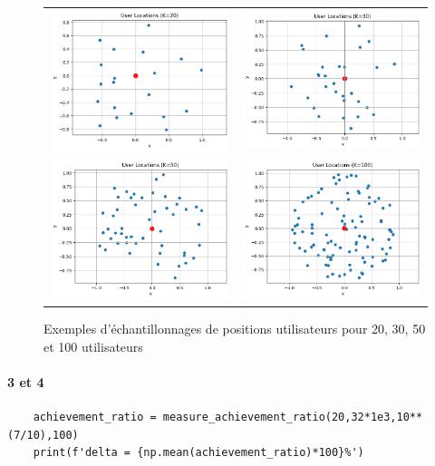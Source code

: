 \documentclass[a4paper,11pt,2]{article}
\begin{document}
\begin{figure}[h]
\centering
\begin{tabular}{cc}
\includegraphics[width =0.4\linewidth]{./Images/k20.png} & \includegraphics[width =0.4\linewidth]{./Images/k30.png}\\
\includegraphics[width =0.4\linewidth]{./Images/k50.png} & \includegraphics[width =0.4\linewidth]{./Images/k100.png}
\end{tabular}
\caption{Exemples d'échantillonnages de positions utilisateurs pour 20, 30, 50 et 100 utilisateurs}
\label{fig:sample}
\end{figure}

\paragraph{3 et 4}
\begin{center}
\begin{lstlisting}
	achievement_ratio = measure_achievement_ratio(20,32*1e3,10**(7/10),100)
	print(f'delta = {np.mean(achievement_ratio)*100}%')
\end{lstlisting}
\end{center}
\end{document}
